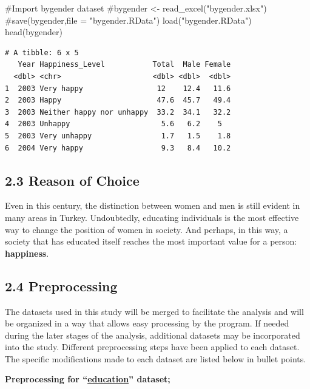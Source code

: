 \documentclass[
  11pt,
  a4paper,
  DIV=11,
  numbers=noendperiod]{scrartcl}
\newenvironment{Shaded}{\begin{snugshade}}{\end{snugshade}}
\newcommand{\CommentTok}[1]{\textcolor[rgb]{0.37,0.37,0.37}{#1}}
\newcommand{\FunctionTok}[1]{\textcolor[rgb]{0.28,0.35,0.67}{#1}}
\newcommand{\NormalTok}[1]{\textcolor[rgb]{0.00,0.23,0.31}{#1}}
\newcommand{\StringTok}[1]{\textcolor[rgb]{0.13,0.47,0.30}{#1}}
\begin{document}
\begin{Shaded}
\begin{Highlighting}[]
\CommentTok{\#Import bygender dataset}
\CommentTok{\#bygender \textless{}{-} read\_excel("bygender.xlsx")}
\CommentTok{\#save(bygender,file = "bygender.RData")}
\FunctionTok{load}\NormalTok{(}\StringTok{"bygender.RData"}\NormalTok{)}
\FunctionTok{head}\NormalTok{(bygender)}
\end{Highlighting}
\end{Shaded}

\begin{verbatim}
# A tibble: 6 x 5
   Year Happiness_Level           Total  Male Female
  <dbl> <chr>                     <dbl> <dbl>  <dbl>
1  2003 Very happy                 12    12.4   11.6
2  2003 Happy                      47.6  45.7   49.4
3  2003 Neither happy nor unhappy  33.2  34.1   32.2
4  2003 Unhappy                     5.6   6.2    5  
5  2003 Very unhappy                1.7   1.5    1.8
6  2004 Very happy                  9.3   8.4   10.2
\end{verbatim}

\subsection{2.3 Reason of Choice}\label{reason-of-choice}

Even in this century, the distinction between women and men is still
evident in many areas in Turkey. Undoubtedly, educating individuals is
the most effective way to change the position of women in society. And
perhaps, in this way, a society that has educated itself reaches the
most important value for a person: {\textbf{happiness}}.

\subsection{2.4 Preprocessing}\label{preprocessing}

The datasets used in this study will be merged to facilitate the
analysis and will be organized in a way that allows easy processing by
the program. If needed during the later stages of the analysis,
additional datasets may be incorporated into the study. Different
preprocessing steps have been applied to each dataset. The specific
modifications made to each dataset are listed below in bullet points.

\textbf{Preprocessing for
``\href{https://github.com/emu-hacettepe-analytics/emu660-spring2025-ecavusgil}{education}''
dataset;}
\end{document}
